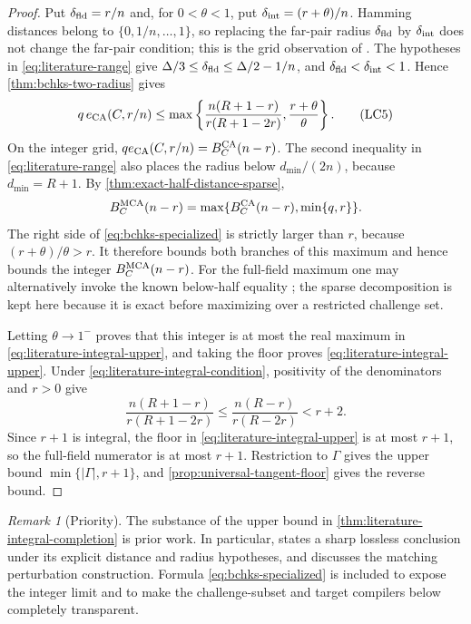 \documentclass[11pt,a4paper]{amsart}
\numberwithin{equation}{section}
\theoremstyle{remark}
\newtheorem{remark}[remark]{Remark}
\newcommand{\abs}[1]{\lvert #1\rvert}
\begin{document}
\begin{proof}
Put \(\delta_{\rm fld}=r/n\) and, for \(0<\theta<1\), put
\(\delta_{\rm int}=(r+\theta)/n\).  Hamming distances belong to
\(\{0,1/n,\ldots,1\}\), so replacing the far-pair radius
\(\delta_{\rm fld}\) by \(\delta_{\rm int}\) does not change the
far-pair condition; this is the grid observation of
\cite[Rem.~4.10]{ABF26}.  The hypotheses in
\eqref{eq:literature-range} give
\(\Delta/3\le\delta_{\rm fld}\le\Delta/2-1/n\), and
\(\delta_{\rm fld}<\delta_{\rm int}<1\).  Hence
\cref{thm:bchks-two-radius} gives
\[
 q\,e_{\rm CA}(C,r/n)
 \le \max\left\{
  \frac{n(R+1-r)}{r(R+1-2r)},\frac{r+\theta}{\theta}
               \right\}.                        \tag{LC5}
 \label{eq:bchks-specialized}
\]
On the integer grid,
\(q e_{\rm CA}(C,r/n)=B_C^{\rm CA}(n-r)\).  The second inequality in
\eqref{eq:literature-range} also places the radius below
\(d_{\min}/(2n)\), because \(d_{\min}=R+1\).  By
\cref{thm:exact-half-distance-sparse},
\[
 B_C^{\rm MCA}(n-r)
   =\max\{B_C^{\rm CA}(n-r),\min\{q,r\}\}.
\]
The right side of \eqref{eq:bchks-specialized} is strictly larger than
\(r\), because \((r+\theta)/\theta>r\).  It therefore bounds both
branches of this maximum and hence bounds the integer
\(B_C^{\rm MCA}(n-r)\).
For the full-field maximum one may alternatively invoke the known
below-half equality \cite[Lem.~4.6]{ABF26}; the sparse decomposition is
kept here because it is exact before maximizing over a restricted
challenge set.

Letting \(\theta\to1^-\) proves that this integer is at most the real
maximum in \eqref{eq:literature-integral-upper}, and taking the floor
proves \eqref{eq:literature-integral-upper}.  Under
\eqref{eq:literature-integral-condition}, positivity of the denominators
and \(r>0\) give
\[
 \frac{n(R+1-r)}{r(R+1-2r)}
 \le \frac{n(R-r)}{r(R-2r)}<r+2.
\]
Since \(r+1\) is integral, the floor in
\eqref{eq:literature-integral-upper} is at most \(r+1\), so the
full-field numerator is at most \(r+1\).
Restriction to \(\Gamma\) gives the upper bound
\(\min\{\abs\Gamma,r+1\}\), and
\cref{prop:universal-tangent-floor} gives the reverse bound.
\end{proof}

\begin{remark}[Priority]
The substance of the upper bound in
\cref{thm:literature-integral-completion} is prior work.  In particular,
\cite[Cor.~1.4]{BCHKS25} states a sharp lossless conclusion under its
explicit distance and radius hypotheses, and \cite[Rem.~2.5]{BCHKS25}
discusses the matching
perturbation construction.  Formula \eqref{eq:bchks-specialized} is
included to expose the integer limit and to make the challenge-subset and
target compilers below completely transparent.
\end{remark}
\end{document}
